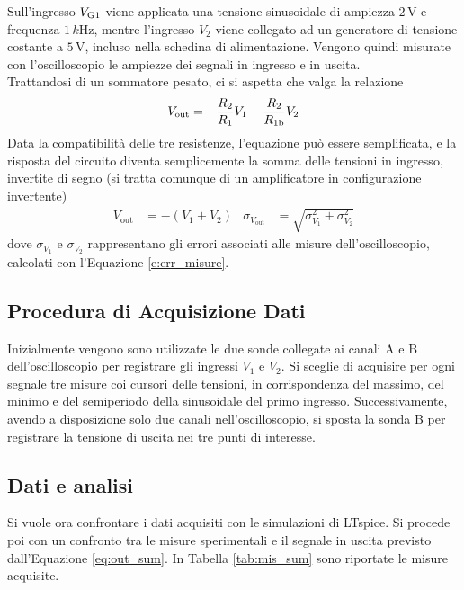 \documentclass[a4paper,11pt]{article}
\newcommand\V{ \,\si{\volt} }
\begin{document}
\noindent Sull'ingresso $V_{\text G1}$ viene applicata una tensione sinusoidale di ampiezza $2 \V$ e
frequenza $1\, \si{k\Hz}$, mentre l'ingresso $V_{2}$
viene collegato ad un generatore di tensione costante a $5\V$, incluso nella schedina
di alimentazione. Vengono quindi misurate con l'oscilloscopio le ampiezze dei segnali in ingresso
e in uscita. \\
Trattandosi di un sommatore pesato, ci si aspetta che valga la relazione
\begin{align}
  V_{\textrm{out}} = - \frac{R_{2}}{R_{1}} V_{1} - \frac{R_{2}}{R_{1\textrm b}} V_{2}
\end{align}
Data la compatibilità delle tre resistenze, l'equazione può essere
semplificata, e la risposta del circuito diventa semplicemente la somma
delle tensioni in ingresso, invertite di segno (si tratta comunque di un
amplificatore in configurazione invertente)
\begin{align}
  \label{eq:out_sum}
  V_{\textrm{out}} & = - (V_{1} + V_{2})
  &
   \sigma_{V_{\textrm{out}}}  &= \sqrt{ \sigma_{V_{1}}^{2} + \sigma_{V_{2}}^{2}}
\end{align}\label{eq:sum_th}
dove $\sigma_{V_{1}}$ e $\sigma_{V_{2}}$ rappresentano gli errori associati
alle misure dell'oscilloscopio, calcolati con l'Equazione \ref{e:err_misure}.
\subsection{Procedura di Acquisizione Dati}
\label{sec:acqu-delle-misure-1}

Inizialmente vengono sono utilizzate le due sonde collegate ai canali A e B
dell'oscilloscopio per registrare gli ingressi $V_{1}$ e $V_{2}$.
Si sceglie di acquisire per ogni segnale tre misure
coi cursori delle tensioni, in corrispondenza del massimo, del minimo
e del semiperiodo della sinusoidale del primo ingresso. Successivamente,
avendo a disposizione solo due canali nell'oscilloscopio, si sposta
la sonda B per registrare la tensione di uscita nei tre punti di
interesse.

\subsection{Dati e analisi}

Si vuole ora confrontare i dati acquisiti con le simulazioni
di LTspice. Si procede poi con un confronto tra le misure sperimentali e
il segnale in uscita previsto dall'Equazione \ref{eq:out_sum}.
In Tabella \ref{tab:mis_sum} sono riportate le misure acquisite.
\end{document}
